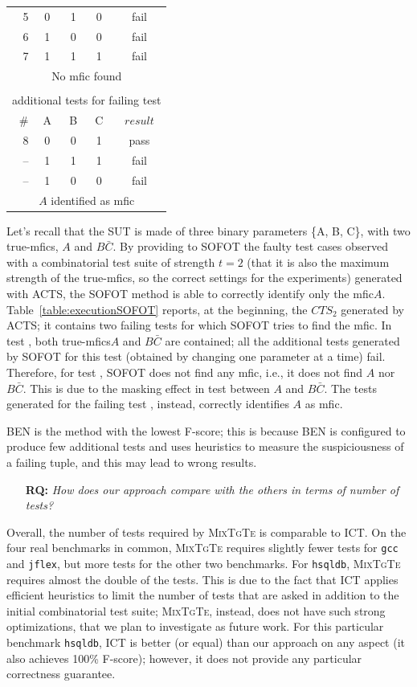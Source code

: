 \documentclass[
12pt, %
oneside, %
english, %
singlespacing, %
headsepline, %
consistentlayout, %
]{MastersDoctoralThesis} %
\newcommand{\mix}{\textsc{MixTgTe}\xspace}
\newcommand{\truemfics}{true-\textsf{mfics}\xspace}
\newcommand{\mfic}{\textsf{mfic}\xspace}
\newcommand{\result}{\ensuremath{\mathit{result}}\xspace}
\newcommand{\cts}{\ensuremath{\mathit{CTS}}\xspace}
\newcommand{\fScore}{\rm{F-score}\xspace}
\newcounter{researchquestionCount}
\newcommand{\researchquestion}[1]{\stepcounter{researchquestionCount}\begin{itemize}\item [\textbf{RQ\arabic{researchquestionCount}:}] \emph{#1}\end{itemize}}
\theoremstyle{plain}
\theoremstyle{definition}
\theoremstyle{remark}
\theoremstyle{plain}
\theoremstyle{plain}
\theoremstyle{remark}
\begin{document}
\begin{table}[!tb]
\begin{tabular}{r|c|c|c||c}
		\hline
		5& 0 & 1 & 0 & \textsf{fail} \\
		6& 1 & 0 & 0 & \textsf{fail} \\
		7& 1 & 1 & 1 & \textsf{fail} \\
		\multicolumn{5}{c}{No \mfic found}\\ 
		\hline
		\multicolumn{5}{c}{} \\
		\hline
		\multicolumn{5}{c}{additional tests for failing test \ding{173}}\\
		\midrule
		\# & A & B & C & \result \\
		\hline
		8& 0 & 0 & 1 & \textsf{pass} \\
		--& 1 & 1 & 1 & \textsf{fail} \\
		--& 1 & 0 & 0 & \textsf{fail} \\
		\multicolumn{5}{c}{$A$ identified as \mfic}\\ 
		\bottomrule
	\end{tabular}
\end{table}
%
Let's recall that the SUT is made of three binary parameters \{A, B, C\}, with two \truemfics, $A$ and $B\bar{C}$. By providing to SOFOT the faulty test cases observed with a combinatorial test suite of strength $t=2$ (that it is also the maximum strength of the \truemfics, so the correct settings for the experiments) generated with ACTS, the SOFOT method is able to correctly identify only the \mfic $A$. Table~\ref{table:executionSOFOT} reports, at the beginning, the $\cts_2$ generated by ACTS; it contains two failing tests for which SOFOT tries to find the \mfic.
In test , both \truemfics $A$ and $B\bar{C}$ are contained; all the additional tests generated by SOFOT for this test (obtained by changing one parameter at a time) fail. Therefore, for test , SOFOT does not find any \mfic, i.e., it does not find $A$ nor $B\bar{C}$. This is due to the masking effect in test  between $A$ and $B\bar{C}$. The tests generated for the failing test , instead, correctly identifies $A$ as \mfic.

BEN is the method with the lowest \fScore; this is because BEN is configured to produce few additional tests and uses heuristics to measure the suspiciousness of a failing tuple, and this may lead to wrong results.

\researchquestion{How does our approach compare with the others in terms of number of tests?}

Overall, the number of tests required by \mix is comparable to ICT. On the four real benchmarks in common, \mix requires slightly fewer tests for \texttt{gcc} and \texttt{jflex}, but more tests for the other two benchmarks. For \texttt{hsqldb}, \mix requires almost the double of the tests. This is due to the fact that ICT applies efficient heuristics to limit the number of tests that are asked in addition to the initial combinatorial test suite; \mix, instead, does not have such strong optimizations, that we plan to investigate as future work. For this particular benchmark \texttt{hsqldb}, ICT is better (or equal) than our approach on any aspect (it also achieves 100\% F-score); however, it does not provide any particular correctness guarantee.
\end{document}
